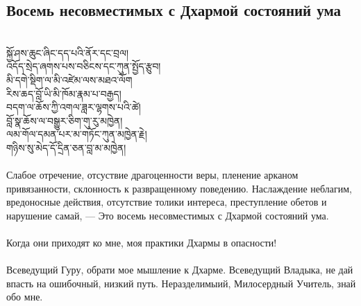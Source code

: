 \subsection*{Восемь несовместимых с Дхармой состояний ума}
\\
\ti
སྐྱོ་ཤས་ཆུང་ཞིང་དད་པའི་ནོར་དང་བྲལ། \\
འདོད་སྲེད་ཞགས་པས་བཅིངས་དང་ཀུན་སྤྱོད་རྩུབ། \\
མི་དགེ་སྡིག་ལ་མི་འཛེམ་ལས་མཐའ་ལོག \\
རིས་ཆད་བློ་ཡི་མི་ཁོམ་རྣམ་པ་བརྒྱད། \\
བདག་ལ་ཆོས་ཀྱི་འགལ་ཟླར་ལྷགས་པའི་ཚེ། \\
བློ་སྣ་ཆོས་ལ་བསྒྱུར་ཅིག་གུ་རུ་མཁྱེན། \\
ལམ་གོལ་དམན་པར་མ་གཏོང་ཀུན་མཁྱེན་རྗེ། \\
གཉིས་སུ་མེད་དོ་དྲིན་ཅན་བླ་མ་མཁྱེན། \\
\\
\ru
Слабое отречение, отсуствие драгоценности веры,
пленение арканом привязанности, склонность к развращенному поведе\-нию.
Наслаждение неблагим, вредоносные действия, отсутствие толики интереса,
преступление обетов и нарушение самай, —
Это восемь несовместимых с Дхармой состояний ума.\\
\\
Когда они приходят ко мне, моя практики Дхармы в опасности!\\
\\
Всеведущий Гуру, обрати мое мышление к Дхарме.
Всеведущий Владыка, не дай впасть на ошибочный, низкий путь.
Нераздели\-мыий, Милосердный Учитель, знай обо мне.

\newpage
